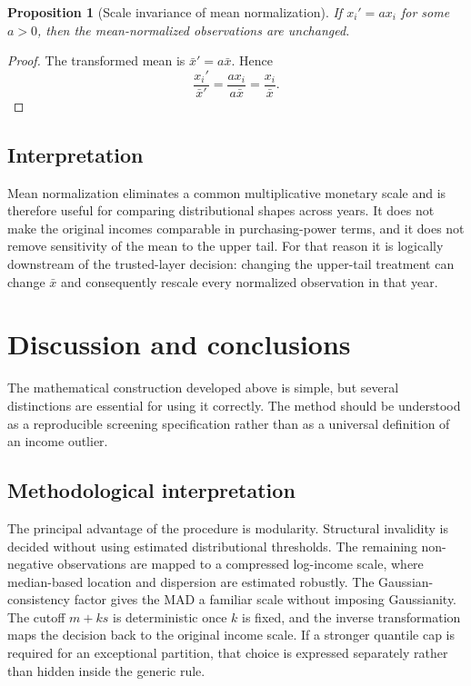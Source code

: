 \documentclass[12pt]{article}
\newcommand{\be}{\begin{equation}}
\newcommand{\ee}{\end{equation}}
\newtheorem{proposition}{Proposition}[section]
\numberwithin{equation}{section}
\begin{document}
\begin{proposition}[Scale invariance of mean normalization]
If $x_i'=a x_i$ for some $a>0$, then the mean-normalized observations are unchanged.
\end{proposition}

\begin{proof}
The transformed mean is $\bar{x}'=a\bar{x}$. Hence
\be
\frac{x_i'}{\bar{x}'}
=
\frac{a x_i}{a\bar{x}}
=
\frac{x_i}{\bar{x}}.
\ee
\end{proof}

\subsection{Interpretation}

Mean normalization eliminates a common multiplicative monetary scale and is therefore useful for comparing distributional shapes across years. It does not make the original incomes comparable in purchasing-power terms, and it does not remove sensitivity of the mean to the upper tail. For that reason it is logically downstream of the trusted-layer decision: changing the upper-tail treatment can change $\bar{x}$ and consequently rescale every normalized observation in that year.

\section{Discussion and conclusions}

The mathematical construction developed above is simple, but several distinctions are essential for using it correctly. The method should be understood as a reproducible screening specification rather than as a universal definition of an income outlier.

\subsection{Methodological interpretation}

The principal advantage of the procedure is modularity. Structural invalidity is decided without using estimated distributional thresholds. The remaining non-negative observations are mapped to a compressed log-income scale, where median-based location and dispersion are estimated robustly. The Gaussian-consistency factor gives the MAD a familiar scale without imposing Gaussianity. The cutoff $m+ks$ is deterministic once $k$ is fixed, and the inverse transformation maps the decision back to the original income scale. If a stronger quantile cap is required for an exceptional partition, that choice is expressed separately rather than hidden inside the generic rule.
\end{document}

